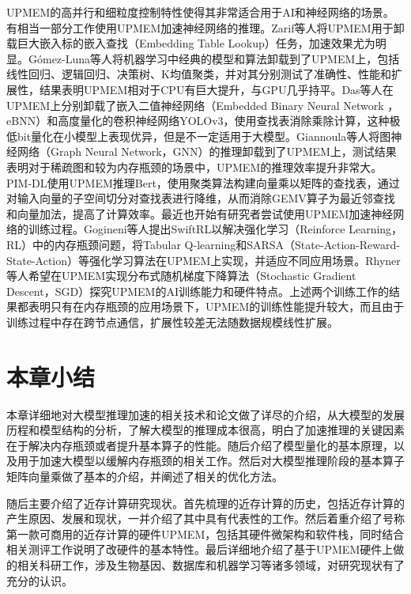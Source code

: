 UPMEM的高并行和细粒度控制特性使得其非常适合用于AI和神经网络的场景。有相当一部分工作使用UPMEM加速神经网络的推理。Zarif等人\cite{UPMEMEmbeddingLookups}将UPMEM用于卸载巨大嵌入标的嵌入查找（Embedding Table Lookup）任务，加速效果尤为明显。Gómez-Luna等人\cite{UPMEMTraditionalML}将机器学习中经典的模型和算法卸载到了UPMEM上，包括线性回归、逻辑回归、决策树、K均值聚类，并对其分别测试了准确性、性能和扩展性，结果表明UPMEM相对于CPU有巨大提升，与GPU几乎持平。Das等人\cite{UPMEMCNN}在UPMEM上分别卸载了嵌入二值神经网络（Embedded Binary Neural Network ，eBNN）和高度量化的卷积神经网络YOLOv3，使用查找表消除乘除计算，这种极低bit量化在小模型上表现优异，但是不一定适用于大模型。Giannoula等人\cite{UPMEMGNN}将图神经网络（Graph Neural Network，GNN）的推理卸载到了UPMEM上，测试结果表明对于稀疏图和较为内存瓶颈的场景中，UPMEM的推理效率提升非常大。PIM-DL\cite{PIM-DL}使用UPMEM推理Bert，使用聚类算法构建向量乘以矩阵的查找表，通过对输入向量的子空间切分对查找表进行降维，从而消除GEMV算子为最近邻查找和向量加法，提高了计算效率。最近也开始有研究者尝试使用UPMEM加速神经网络的训练过程。Gogineni等人\cite{SwiftRL}提出SwiftRL以解决强化学习（Reinforce Learning，RL）中的内存瓶颈问题，将Tabular Q-learning和SARSA（State-Action-Reward-State-Action）等强化学习算法在UPMEM上实现，并适应不同应用场景。Rhyner等人\cite{PIM-Opt}希望在UPMEM实现分布式随机梯度下降算法（Stochastic Gradient Descent，SGD）探究UPMEM的AI训练能力和硬件特点。上述两个训练工作的结果都表明只有在内存瓶颈的应用场景下，UPMEM的训练性能提升较大，而且由于训练过程中存在跨节点通信，扩展性较差无法随数据规模线性扩展。

\section{本章小结}
本章详细地对大模型推理加速的相关技术和论文做了详尽的介绍，从大模型的发展历程和模型结构的分析，了解大模型的推理成本很高，明白了加速推理的关键因素在于解决内存瓶颈或者提升基本算子的性能。随后介绍了模型量化的基本原理，以及用于加速大模型以缓解内存瓶颈的相关工作。然后对大模型推理阶段的基本算子矩阵向量乘做了基本的介绍，并阐述了相关的优化方法。

随后主要介绍了近存计算研究现状。首先梳理的近存计算的历史，包括近存计算的产生原因、发展和现状，一并介绍了其中具有代表性的工作。然后着重介绍了号称第一款可商用的近存计算的硬件UPMEM，包括其硬件微架构和软件栈，同时结合相关测评工作说明了改硬件的基本特性。最后详细地介绍了基于UPMEM硬件上做的相关科研工作，涉及生物基因、数据库和机器学习等诸多领域，对研究现状有了充分的认识。